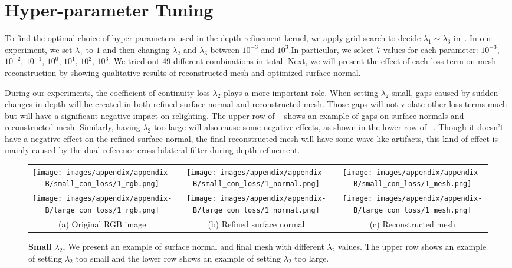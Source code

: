 \chapter{Hyper-parameter Tuning}
\label{apd:B}
To find the optimal choice of hyper-parameters used in the depth refinement kernel, we apply grid search to decide $\lambda_1 \sim \lambda_3$ in~. In our experiment, we set $\lambda_1$ to $1$ and then changing $\lambda_2$ and $\lambda_3$ between $10^{-3}$ and $10^3$.In particular, we select $7$ values for each parameter: $10^{-3}$, $10^{-2}$, $10^{-1}$, $10^0$, $10^1$, $10^2$, $10^3$. We tried out 49 different combinations in total. Next, we will present the effect of each loss term on mesh reconstruction by showing qualitative results of reconstructed mesh and optimized surface normal.

During our experiments, the coefficient of continuity loss $\lambda_2$ plays a more important role. When setting $\lambda_2$ small, gaps caused by sudden changes in depth will be created in both refined surface normal and reconstructed mesh. Those gaps will not violate other loss terms much but will have a significant negative impact on relighting. The upper row of ~ shows an example of gaps on surface normals and reconstructed mesh. Similarly, having $\lambda_2$ too large will also cause some negative effects, as shown in the lower row of ~. Though it doesn't have a negative effect on the refined surface normal, the final reconstructed mesh will have some wave-like artifacts, this kind of effect is mainly caused by the dual-reference cross-bilateral filter during depth refinement.

\begin{figure}[h!]
\centering
\begin{tabular}{@{}c@{\hspace{1mm}}c@{\hspace{1mm}}c@{}}
\texttt{[image: images/appendix/appendix-B/small\_con\_loss/1\_rgb.png]} &
\texttt{[image: images/appendix/appendix-B/small\_con\_loss/1\_normal.png]}  &
\texttt{[image: images/appendix/appendix-B/small\_con\_loss/1\_mesh.png]}\\
\texttt{[image: images/appendix/appendix-B/large\_con\_loss/1\_rgb.png]} &
\texttt{[image: images/appendix/appendix-B/large\_con\_loss/1\_normal.png]}  &
\texttt{[image: images/appendix/appendix-B/large\_con\_loss/1\_mesh.png]}\\
\small (a) Original RGB image & \small (b) Refined surface normal & 
\small (c) Reconstructed mesh\\
\end{tabular}
\caption{\textbf{Small $\lambda_2$.} We present an example of surface normal and final mesh with different $\lambda_2$ values. The upper row shows an example of setting $\lambda_2$ too small and the lower row shows an example of setting $\lambda_2$ too large.}
\label{fig:small_con_loss}
\end{figure}

